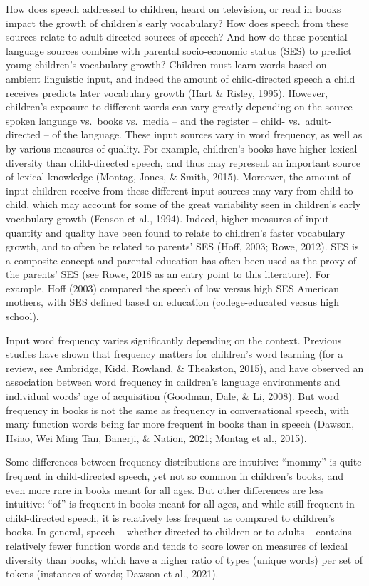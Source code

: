 \documentclass[10pt, letterpaper]{article}
\begin{document}
How does speech addressed to children, heard on television, or read in
books impact the growth of children's early vocabulary? How does speech
from these sources relate to adult-directed sources of speech? And how
do these potential language sources combine with parental socio-economic
status (SES) to predict young children's vocabulary growth? Children
must learn words based on ambient linguistic input, and indeed the
amount of child-directed speech a child receives predicts later
vocabulary growth (Hart \& Risley, 1995). However, children's exposure
to different words can vary greatly depending on the source -- spoken
language vs.~books vs.~media -- and the register -- child-
vs.~adult-directed -- of the language. These input sources vary in word
frequency, as well as by various measures of quality. For example,
children's books have higher lexical diversity than child-directed
speech, and thus may represent an important source of lexical knowledge
(Montag, Jones, \& Smith, 2015). Moreover, the amount of input children
receive from these different input sources may vary from child to child,
which may account for some of the great variability seen in children's
early vocabulary growth (Fenson et al., 1994). Indeed, higher measures
of input quantity and quality have been found to relate to children's
faster vocabulary growth, and to often be related to parents' SES (Hoff,
2003; Rowe, 2012). SES is a composite concept and parental education has
often been used as the proxy of the parents' SES (see Rowe, 2018 as an
entry point to this literature). For example, Hoff (2003) compared the
speech of low versus high SES American mothers, with SES defined based
on education (college-educated versus high school).

Input word frequency varies significantly depending on the context.
Previous studies have shown that frequency matters for children's word
learning (for a review, see Ambridge, Kidd, Rowland, \& Theakston,
2015), and have observed an association between word frequency in
children's language environments and individual words' age of
acquisition (Goodman, Dale, \& Li, 2008). But word frequency in books is
not the same as frequency in conversational speech, with many function
words being far more frequent in books than in speech (Dawson, Hsiao,
Wei Ming Tan, Banerji, \& Nation, 2021; Montag et al., 2015).

Some differences between frequency distributions are intuitive:
``mommy'' is quite frequent in child-directed speech, yet not so common
in children's books, and even more rare in books meant for all ages. But
other differences are less intuitive: ``of'' is frequent in books meant
for all ages, and while still frequent in child-directed speech, it is
relatively less frequent as compared to children's books. In general,
speech -- whether directed to children or to adults -- contains
relatively fewer function words and tends to score lower on measures of
lexical diversity than books, which have a higher ratio of types (unique
words) per set of tokens (instances of words; Dawson et al., 2021).
\end{document}
